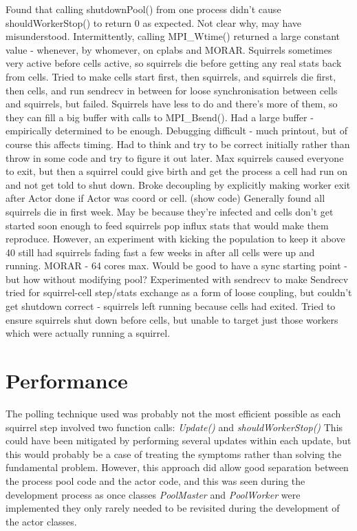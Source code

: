 \documentclass[11pt, oneside]{article}   %
\begin{document}
Found that calling shutdownPool() from one process didn't cause shouldWorkerStop() to return 0 as expected.
Not clear why, may have misunderstood.
Intermittently, calling MPI\_Wtime() returned a large constant value - whenever, by whomever, on cplabs and MORAR.
Squirrels sometimes very active before cells active, so squirrels die before getting any real stats back from cells.
Tried to make cells start first, then squirrels, and squirrels die first, then cells, and run sendrecv in between for loose synchronisation between cells and squirrels, but failed.
Squirrels have less to do and there's more of them, so they can fill a big buffer with calls to MPI\_Bsend().
Had a large buffer - empirically determined to be enough.
Debugging difficult - much printout, but of course this affects timing.
Had to think and try to be correct initially rather than throw in some code and try to figure it out later.
Max squirrels caused everyone to exit, but then a squirrel could give birth and get the process a cell had run on and not get told to shut down.
Broke decoupling by explicitly making worker exit after Actor done if Actor was coord or cell. (show code)
Generally found all squirrels die in first week.  May be because they're infected and cells don't get started soon enough to feed squirrels pop influx stats that would make them reproduce.
However, an experiment with kicking the population to keep it above 40 still had squirrels fading fast a few weeks in after all cells were up and running.
MORAR - 64 cores max.
Would be good to have a sync starting point - but how without modifying pool?
Experimented with sendrecv to make 
Sendrecv tried for squirrel-cell step/stats exchange as a form of loose coupling, but couldn't get shutdown correct - squirrels left running because cells had exited.
Tried to ensure squirrels shut down before cells, but unable to target just those workers which were actually running a squirrel.

\section{Performance}

The polling technique used was probably not the most efficient possible as each squirrel step involved two function calls: {\em Update()} and {\em shouldWorkerStop()}
This could have been mitigated by performing several updates within each update, but this would probably be a case of treating the symptoms rather than solving the fundamental problem.
However, this approach did allow good separation between the process pool code and the actor code, and this was seen during the development process as once classes {\em PoolMaster} and {\em PoolWorker} were implemented they only rarely needed to be revisited during the development of the actor classes.
\end{document}
